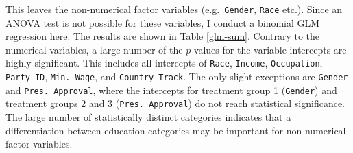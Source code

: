 \documentclass[12pt,econ]{sources/authesis}
\begin{document}
This leaves the non-numerical factor variables (e.g.~\texttt{Gender}, \texttt{Race} etc.). Since an ANOVA test is not possible for these variables, I conduct a binomial GLM regression here. The results are shown in Table \ref{glm-sum}. Contrary to the numerical variables, a large number of the \(p\)-values for the variable intercepts are highly significant. This includes all intercepts of \texttt{Race}, \texttt{Income}, \texttt{Occupation}, \texttt{Party\ ID}, \texttt{Min.\ Wage}, and \texttt{Country\ Track}. The only slight exceptions are \texttt{Gender} and \texttt{Pres.\ Approval}, where the intercepts for treatment group 1 (\texttt{Gender}) and treatment groups 2 and 3 (\texttt{Pres.\ Approval}) do not reach statistical significance. The large number of statistically distinct categories indicates that a differentiation between education categories may be important for non-numerical factor variables.

\ssp
\end{document}
